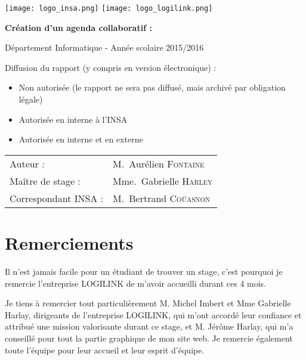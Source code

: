 \documentclass[a4paper, 11pt]{report}
\begin{document}
\renewcommand{\bibname}{Références}

\begin{titlepage}
    \texttt{[image: logo\_insa.png]}
    \hspace{0.35\textwidth}
    \texttt{[image: logo\_logilink.png]}
    \begin{center}
        \vspace{7cm}
        {\huge\bfseries Création d'un agenda collaboratif : \agenda \par}
        \vspace{0.5cm}
        {\Large Département Informatique - Année scolaire 2015/2016\par}
    \end{center}
    \vfill

    Diffusion du rapport (y compris en version électronique) :

    \begin{itemize}[label=$\square$]
        \item Non autorisée (le rapport ne sera pas diffusé, mais archivé par obligation légale)
        \item Autorisée en interne à l’INSA
        \item Autorisée en interne et en externe
    \end{itemize}

    \vspace{0.5cm}

    \begin{tabular}{ll}
        {\Large Auteur :}             & M.~Aurélien \textsc{Fontaine}\\
        {\Large Maître de stage :}    & Mme.~Gabrielle \textsc{Harley}\\
        {\Large Correspondant INSA :} & M.~Bertrand \textsc{Coüasnon}\\
    \end{tabular}
\end{titlepage}

\chapter*{Remerciements}

Il n'est jamais facile pour un étudiant de trouver un stage, c'est pourquoi je remercie l'entreprise LOGILINK de m'avoir accueilli durant ces 4 mois.

Je tiens à remercier tout particulièrement M. Michel Imbert et Mme Gabrielle Harlay, dirigeants de l'entreprise LOGILINK,  qui m'ont accordé leur confiance et attribué une mission valorisante durant ce stage, et M. Jérôme Harlay, qui m'a conseillé pour tout la partie graphique de mon site web. Je remercie également toute l'équipe pour leur accueil et leur esprit d'équipe.
\end{document}
